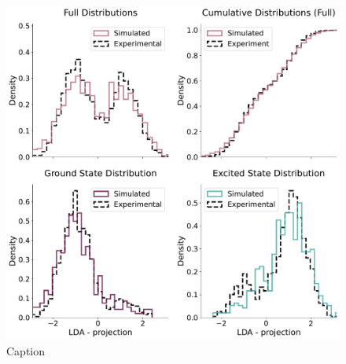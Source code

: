 \begin{figure}
    \centering
    \includegraphics{Readout/Figs/Weighted_comparison_with_simmulation.pdf}
    \caption{Caption}
    \label{fig:enter-label}
\end{figure}


